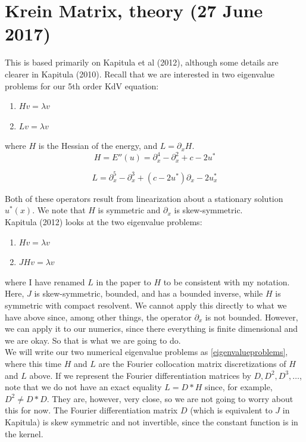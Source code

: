\documentclass[12pt]{article}
\begin{document}
\section{Krein Matrix, theory (27 June 2017)}

This is based primarily on Kapitula et al (2012), although some details are clearer in Kapitula (2010). Recall that we are interested in two eigenvalue problems for our 5th order KdV equation:

\begin{enumerate}\label{eigenvalueproblems}
	\item $H v = \lambda v$
	\item $L v = \lambda v$
\end{enumerate}

where $H$ is the Hessian of the energy, and $L = \partial_x H$. 
\begin{equation}\label{linear4th}
H = E''(u) = \partial_x^4 - \partial_x^2 + c - 2 u^*
\end{equation}

\begin{equation}\label{linear5th}
L = \partial_x^5 - \partial_x^3 + (c - 2 u^*) \partial_x - 2 u^*_x
\end{equation}

Both of these operators result from linearization about a stationary solution $u^*(x)$. We note that $H$ is symmetric and $\partial_x$ is skew-symmetric.\\

Kapitula (2012) looks at the two eigenvalue problems:

\begin{enumerate}
	\item $H v = \lambda v$
	\item $J H v = \lambda v$
\end{enumerate}
where I have renamed $L$ in the paper to $H$ to be consistent with my notation. Here, $J$ is skew-symmetric, bounded, and has a bounded inverse, while $H$ is symmetric with compact resolvent. We cannot apply this directly to what we have above since, among other things, the operator $\partial_x$ is not bounded. However, we can apply it to our numerics, since there everything is finite dimensional and we are okay. So that is what we are going to do.\\

We will write our two numerical eigenvalue problems as \eqref{eigenvalueproblems}, where this time $H$ and $L$ are the Fourier collocation matrix discretizations of $H$ and $L$ above. If we represent the Fourier differentiation matrices by $D, D^2, D^3, \dots$, note that we do not have an exact equality $L = D*H$ since, for example, $D^2 \neq D*D$. They are, however, very close, so we are not going to worry about this for now. The Fourier differentiation matrix $D$ (which is equivalent to $J$ in Kapitula) is skew symmetric and not invertible, since the constant function is in the kernel.\\
\end{document}
